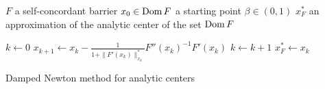 \begin{algorithm}[ht]
  \begin{algorithmic}[1]
    \Require
      \Statex $F$ a self-concordant barrier
      \Statex $x_0 \in \operatorname{Dom} F$ a starting point
      \Statex $\beta \in (0,1)$
    \Ensure
      \Statex $x^*_F$ an approximation of the analytic center of the set $\operatorname{Dom} F$
      \Statex

    \State $k \gets 0$
      \State $x_{k+1} \gets x_k - \frac{1}{1+\|F'(x_k)\|_{x_k}^*}F''(x_k)^{-1}F'(x_k)$
      \State $k \gets k + 1$
    \EndWhile
    \State \Return $x^*_F \gets x_k$

  \end{algorithmic}
  \caption{Damped Newton method for analytic centers}
\end{algorithm}
